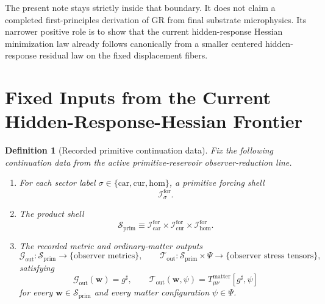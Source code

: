 \documentclass[11pt]{article}
\newcommand{\CompletedMetric}{g^{\sharp}}
\newcommand{\MatterSpace}{\Psi}
\newcommand{\Car}{\mathrm{car}}
\newcommand{\Cur}{\mathrm{cur}}
\newcommand{\Hom}{\mathrm{hom}}
\newcommand{\ForSpace}[1]{\mathcal I_{#1}^{\mathrm{for}}}
\newcommand{\PrimShell}{\mathcal S_{\mathrm{prim}}}
\newcommand{\MetricOut}{\mathscr G_{\mathrm{out}}}
\newcommand{\MatterOut}{\mathscr T_{\mathrm{out}}}
\newtheorem{definition}{Definition}
\begin{document}
The present note stays strictly inside that boundary. It does not claim a completed first-principles derivation of GR from final substrate microphysics. Its narrower positive role is to show that the current hidden-response Hessian minimization law already follows canonically from a smaller centered hidden-response residual law on the fixed displacement fibers.

\section{Fixed Inputs from the Current Hidden-Response-Hessian Frontier}

\begin{definition}[Recorded primitive continuation data]
\label{def:fixed}
Fix the following continuation data from the active primitive-reservoir observer-reduction line.
\begin{enumerate}
    \item For each sector label \(\sigma\in\{\Car,\Cur,\Hom\}\), a primitive forcing shell
    \[
    \ForSpace{\sigma}.
    \]
    \item The product shell
    \[
    \PrimShell
    \equiv
    \ForSpace{\Car}\times \ForSpace{\Cur}\times \ForSpace{\Hom}.
    \]
    \item The recorded metric and ordinary-matter outputs
    \[
    \MetricOut:\PrimShell\to\{\text{observer metrics}\},
    \qquad
    \MatterOut:\PrimShell\times\MatterSpace\to\{\text{observer stress tensors}\},
    \]
    satisfying
    \begin{equation}
    \MetricOut(\mathbf w)=\CompletedMetric,
    \qquad
    \MatterOut(\mathbf w,\psi)
    =
    T_{\mu\nu}^{\mathrm{matter}}[\CompletedMetric,\psi]
    \label{eq:fixedoutputs}
    \end{equation}
    for every \(\mathbf w\in\PrimShell\) and every matter configuration \(\psi\in\MatterSpace\).
\end{enumerate}
\end{definition}
\end{document}
